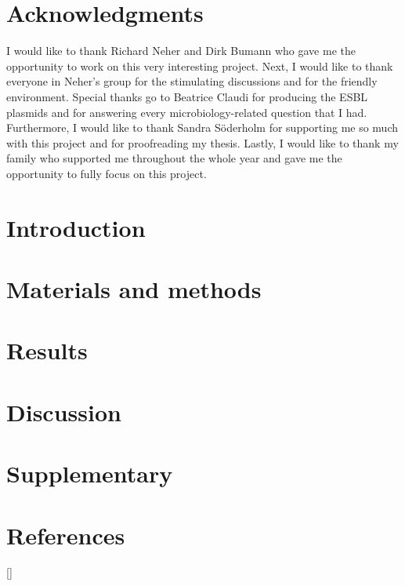 \documentclass[12pt,twoside]{report}
\begin{document}
\chapter*{Acknowledgments}
I would like to thank Richard Neher and Dirk Bumann who gave me the opportunity to work on this very interesting project. Next, I would like to thank everyone in Neher's group for the stimulating discussions and for the friendly environment. Special thanks go to Beatrice Claudi for producing the ESBL plasmids and for answering every microbiology-related question that I had. Furthermore, I would like to thank Sandra Söderholm for supporting me so much with this project and for proofreading my thesis. 
Lastly, I would like to thank my family who supported me throughout the whole year and gave me the opportunity to fully focus on this project. 
\tableofcontents
{}
\chapter{Introduction}



\chapter{Materials and methods}


\chapter{Results}


\chapter{Discussion}

\chapter{Supplementary}

\chapter{References}
\let\Origclearpage\clearpage
\let\clearpage\relax
{}[\refname]{}
\printbibliography


\end{document}
